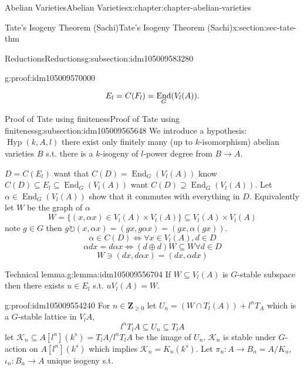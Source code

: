 \documentclass[oneside,10pt,]{book}
\newcommand{\qedhere}{\relax}
\numberwithin{equation}{section}
\newcommand{\lb}{[}
\newcommand{\rb}{]}
\newcommand{\ZZ}{\mathbf{Z}}
\newcommand{\acts}{\circlearrowright}
\DeclareMathOperator{\End}{End}
\begin{document}
\begin{chapterptx}{Abelian Varieties}{}{Abelian Varieties}{}{}{x:chapter:chapter-abelian-varieties}
\begin{sectionptx}{Tate's Isogeny Theorem (Sachi)}{}{Tate's Isogeny Theorem (Sachi)}{}{}{x:section:sec-tate-thm}
\begin{subsectionptx}{Reductions}{}{Reductions}{}{}{g:subsection:idm105009583280}
\begin{proofptx}{}{g:proof:idm105009570000}
\begin{enumerate}
\begin{equation*}
E_l = C(F_l) = \End_G(V_l(A))\text{.}\qedhere
\end{equation*}
%
\end{enumerate}
%
\end{proofptx}
\end{subsectionptx}
%
%
\typeout{************************************************}
\typeout{************************************************}
%
\begin{subsectionptx}{Proof of Tate using finiteness}{}{Proof of Tate using finiteness}{}{}{g:subsection:idm105009565648}
We introduce a hypothesis: \(\operatorname{Hyp}(k,A,l)\) there exist only finitely many (up to \(k\)-isomorphism) abelian varieties \(B\) s.t. there is a \(k\)-isogeny of \(l\)-power degree from \(B\to A\).%
\par
\(D =C(E_l)\) want that \(C(D) = \End_G(V_l(A))\) know \(C(D) \subseteq E_l \subseteq \End_G(V_l(A))\) want \(C(D) \supseteq \End_G(V_l(A))\). Let \(\alpha \in \End_G(V_l(A))\) show that it commutes with everything in \(D\). Equivalently let \(W\) be the graph of \(\alpha\)%
\begin{equation*}
W = \{(x,\alpha x) \in V_l(A)\times V_l(A)\} \subseteq V_l(A)\times V_l(A)
\end{equation*}
note \(g\in G\) then \(g\acts (x,\alpha x) = (gx,g\alpha x ) = (gx, \alpha(gx))\).%
\begin{equation*}
\alpha\in C(D) \iff \forall x\in V_l(A), d\in D
\end{equation*}
%
\begin{equation*}
\alpha d x = d\alpha x \iff (d\oplus d)W \subseteq W \forall d\in D
\end{equation*}
%
\begin{equation*}
W\ni (dx, d\alpha x) = (dx, \alpha d x)
\end{equation*}
%
\begin{lemma}{Technical lemma.}{}{g:lemma:idm105009556704}%
If \(W\subseteq V_l(A)\) is \(G\)-stable subspace then there exists \(u\in E_l\) s.t. \(u V_l(A) = W\).%
\end{lemma}
\begin{proofptx}{}{g:proof:idm105009554240}
For \(n \in \ZZ_{\ge 0}\) let \(U_n = (W\cap T_l(A)) + l^n T_A\) which is a \(G\)-stable lattice in \(V_l A\),%
\begin{equation*}
l^nT_lA \subseteq U_n \subseteq T_l A
\end{equation*}
let \(\mathcal K_n \subseteq A\lb l^n \rb (k^s) = T_l A/ l^n T_l A\) be the image of \(U_n\). \(\mathcal K_n\) is stable under \(G\)-action on \(A\lb l^n \rb (k^s)\) which implies \(\mathcal K_n = K_n (k^s)\). Let \(\pi_n \colon A \to B_n = A/ K_n\), \(\iota_n \colon B_n \to A\) unique isogeny s.t.%

\end{proofptx}
\end{subsectionptx}
\end{sectionptx}
\end{chapterptx}
\end{document}
